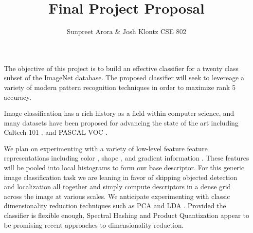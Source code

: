 \documentclass[12pt]{article}
\begin{document}
 
\title{Final Project Proposal}
\author{Sunpreet Arora \& Josh Klontz
CSE 802}
 
\maketitle

The objective of this project is to build an effective classifier for a twenty class subset of the ImageNet \cite{imagenet} database.
The proposed classifier will seek to levereage a variety of modern pattern recognition techniques in order to maximize rank 5 accuracy.

Image classification has a rich history as a field within computer science, and many datasets have been proposed for advancing the state of the art including Caltech 101 \cite{caltech101}, and PASCAL VOC \cite{pascal09}.

We plan on experimenting with a variety of low-level feature feature representations including color \cite{sande10}, shape \cite{ahonen06}, and gradient information \cite{lowe04,dalal05}.
These features will be pooled into local histograms to form our base descriptor.
For this generic image classification task we are leaning in favor of skipping objected detection and localization all together and simply compute descriptors in a dense grid across the image at various scales.
We anticipate experimenting with classic dimensionality reduction techniques such as PCA \cite{turk91} and LDA \cite{belhumeur97}.
Provided the classifier is flexible enough, Spectral Hashing \cite{weiss2008} and Product Quantization \cite{jegou2011} appear to be promising recent approaches to dimensionality reduction.



\end{document}
